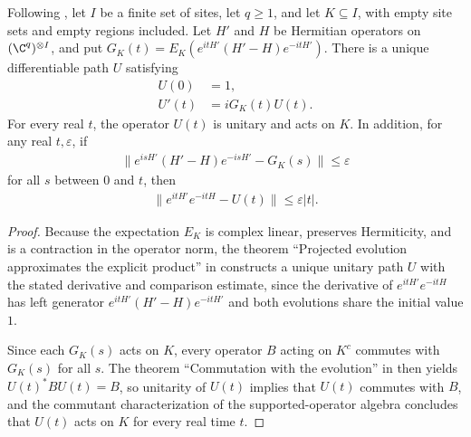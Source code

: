 \begin{lemma}
    \label{thm:qc_supported_projected_relative_evolution}
    \leanok
    Following \cite{OpenAI2026PolynomialPEPS}, let $I$ be a finite set of
    sites, let $q\geq1$, and let $K\subseteq I$, with empty site sets and
    empty regions included.
    Let $H'$ and $H$ be Hermitian operators on $(\C^q)^{\otimes I}$, and put
    $G_K(t)=E_K(e^{itH'}(H'-H)e^{-itH'})$. There is a unique differentiable
    path $U$ satisfying
    \begin{align*}
        U(0)  & =1,           \\
        U'(t) & =iG_K(t)U(t).
    \end{align*}
    For every real $t$, the operator $U(t)$ is unitary and acts on $K$.
    In addition, for any real $t,\varepsilon$, if
    \begin{align*}
        \|e^{isH'}(H'-H)e^{-isH'}-G_K(s)\|\leq\varepsilon
    \end{align*}
    for all $s$ between $0$ and $t$, then
    \begin{align*}
        \|e^{itH'}e^{-itH}-U(t)\|\leq\varepsilon |t|.
    \end{align*}
\end{lemma}
\begin{proof}
    \leanok
    Because the expectation $E_K$ is complex linear, preserves Hermiticity,
    and is a contraction in the operator norm, the theorem ``Projected
    evolution approximates the explicit product'' in
    \cite{QICLean2026Blueprint} constructs a unique unitary path $U$ with the
    stated derivative and comparison estimate, since the derivative of
    $e^{itH'}e^{-itH}$ has left generator $e^{itH'}(H'-H)e^{-itH'}$ and both
    evolutions share the initial value $1$.

    Since each $G_K(s)$ acts on $K$, every operator $B$ acting on $K^c$
    commutes with $G_K(s)$ for all $s$. The theorem ``Commutation with the
    evolution'' in \cite{QICLean2026Blueprint} then yields
    $U(t)^*BU(t)=B$, so unitarity of $U(t)$ implies that $U(t)$ commutes with
    $B$, and the commutant characterization of the supported-operator algebra
    concludes that $U(t)$ acts on $K$ for every real time $t$.
\end{proof}


